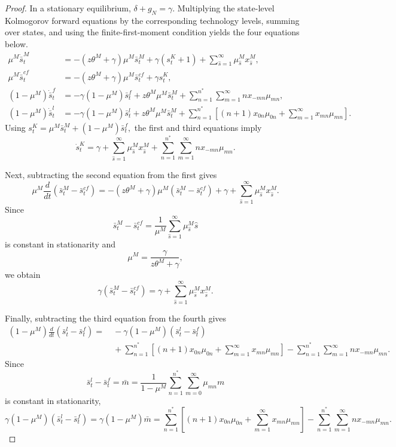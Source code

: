 \documentclass[12pt]{article}
\begin{document}
\begin{proof}
In a stationary equilibrium, \(\delta+g_N=\gamma\). Multiplying the state-level Kolmogorov forward equations by the corresponding technology levels, summing over states, and using the finite-first-moment condition yields the four equations below.
\begin{align*}
\mu^M\dot{\bar{s}}^M_t
&=-(z\theta^M+\gamma)\mu^M\bar{s}^M_t+\gamma(s^K_t+1)+\sum_{\hat{s}=1}^\infty \mu^M_{\hat{s}}x^M_{\hat{s}},\\
\mu^M\dot{\bar{s}}^{cf}_t
&=-(z\theta^M+\gamma)\mu^M\bar{s}^{cf}_t+\gamma s^K_t,\\
(1-\mu^M)\dot{\bar{s}}^f_t
&=-\gamma(1-\mu^M)\bar{s}^f_t+z\theta^M\mu^M\bar{s}^M_t+\sum_{n=1}^{n^\ast}\sum_{m=1}^\infty n x_{-mn}\mu_{mn},\\
(1-\mu^M)\dot{\bar{s}}^l_t
&=-\gamma(1-\mu^M)\bar{s}^l_t+z\theta^M\mu^M\bar{s}^M_t+\sum_{n=1}^{n^\ast}\left[(n+1)x_{0n}\mu_{0n}+\sum_{m=1}^\infty x_{mn}\mu_{mn}\right] .
\end{align*}
Using \(s^K_t=\mu^M\bar{s}^M_t+(1-\mu^M)\bar{s}^f_t,\)
the first and third equations imply
\[
\dot{s}^K_t=\gamma+\sum_{\hat{s}=1}^\infty \mu^M_{\hat{s}}x^M_{\hat{s}}+\sum_{n=1}^{n^\ast}\sum_{m=1}^\infty n x_{-mn}\mu_{mn}.
\]

Next, subtracting the second equation from the first gives
\[
\mu^M\frac{d}{dt}(\bar{s}^M_t-\bar{s}^{cf}_t)
=-(z\theta^M+\gamma)\mu^M(\bar{s}^M_t-\bar{s}^{cf}_t)+\gamma+\sum_{\hat{s}=1}^\infty \mu^M_{\hat{s}}x^M_{\hat{s}}.
\]
Since
\[
\bar{s}^M_t-\bar{s}^{cf}_t
=
\frac{1}{\mu^M}\sum_{\hat{s}=1}^\infty \mu^M_{\hat{s}}\hat{s}
\]
is constant in stationarity and
\[
\mu^M=\frac{\gamma}{z\theta^M+\gamma},
\]
we obtain
\[
\gamma(\bar{s}^M_t-\bar{s}^{cf}_t)=\gamma+\sum_{\hat{s}=1}^\infty \mu^M_{\hat{s}}x^M_{\hat{s}}.
\]

Finally, subtracting the third equation from the fourth gives
\begin{align*}
(1-\mu^M)\frac{d}{dt}(\bar{s}^l_t-\bar{s}^f_t)=&\ -\gamma(1-\mu^M)(\bar{s}^l_t-\bar{s}^f_t)\\
&\ +\sum_{n=1}^{n^\ast}\left[(n+1)x_{0n}\mu_{0n}+\sum_{m=1}^\infty x_{mn}\mu_{mn}\right]-\sum_{n=1}^{n^\ast}\sum_{m=1}^\infty n x_{-mn}\mu_{mn}.
\end{align*}
Since
\[
\bar{s}^l_t-\bar{s}^f_t
=
\bar m
=
\frac{1}{1-\mu^M}
\sum_{n=1}^{n^\ast}\sum_{m=0}^\infty \mu_{mn}m
\]
is constant in stationarity,
\[
\gamma(1-\mu^M)(\bar{s}^l_t-\bar{s}^f_t)
=
\gamma(1-\mu^M)\bar m
=
\sum_{n=1}^{n^\ast}\left[(n+1)x_{0n}\mu_{0n}+\sum_{m=1}^\infty x_{mn}\mu_{mn}\right]-\sum_{n=1}^{n^\ast}\sum_{m=1}^\infty n x_{-mn}\mu_{mn}.
\]
\end{proof}
\end{document}

